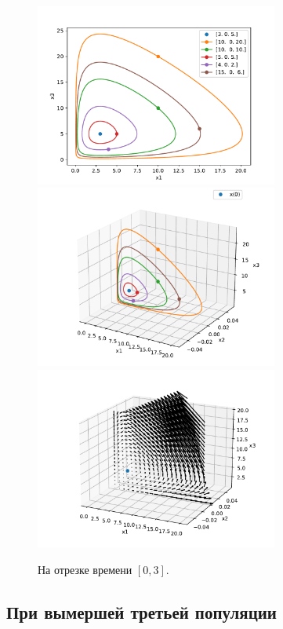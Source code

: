     \begin{figure}[H]
        \centering
        \includegraphics[width=8cm]{pictures/x2_0phase.pdf}
        \includegraphics[width=8cm]{pictures/x2_0phase3.pdf}
        \includegraphics[width=8cm]{pictures/x2_0vector3.pdf}
        \caption{На отрезке времени \( [0, 3] \).}
    \end{figure}


    \subsection{При вымершей третьей популяции}

